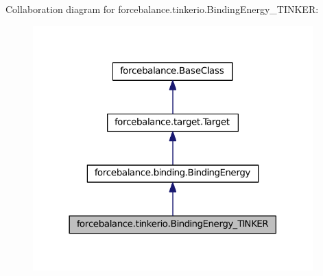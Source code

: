 \-Collaboration diagram for forcebalance.\-tinkerio.\-Binding\-Energy\-\_\-\-T\-I\-N\-K\-E\-R\-:\nopagebreak
\begin{figure}[H]
\begin{center}
\leavevmode
\includegraphics[width=306pt]{classforcebalance_1_1tinkerio_1_1BindingEnergy__TINKER__coll__graph}
\end{center}
\end{figure}
